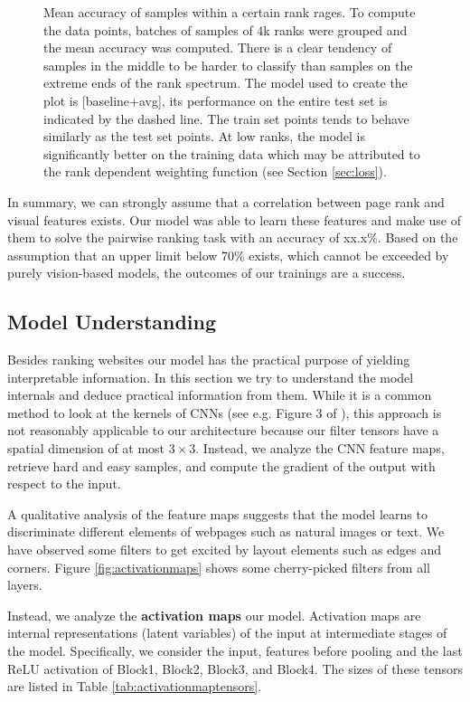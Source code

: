\begin{figure}
\begin{tikzpicture}
      \end{tikzpicture}
    \caption[Accuracy vs. rank]{Mean accuracy of samples within a certain rank rages. To compute the data points, batches of samples of 4k ranks were grouped and the mean accuracy was computed. There is a clear tendency of samples in the middle to be harder to classify than samples on the extreme ends of the rank spectrum. The model used to create the plot is [baseline+avg], its performance on the entire test set is indicated by the dashed line. The train set points tends to behave similarly as the test set points. At low ranks, the model is significantly better on the training data which may be attributed to the rank dependent weighting function (see Section \ref{sec:loss}).}
    \label{fig:accvsrank}
\end{figure}

In summary, we can strongly assume that a correlation between page rank and visual features exists. Our model was able to learn these features and make use of them to solve the pairwise ranking task with an accuracy of xx.x\%. Based on the assumption that an upper limit below 70\% exists, which cannot be exceeded by purely vision-based models, the outcomes of our trainings are a success.

\subsection{Model Understanding}

Besides ranking websites our model has the practical purpose of yielding interpretable information. In this section we try to understand the model internals and deduce practical information from them. While it is a common method to look at the kernels of CNNs (see e.g. Figure 3 of \cite{krizhevsky:imagenet}), this approach is not reasonably applicable to our architecture because our filter tensors have a spatial dimension of at most $3\times3$. Instead, we analyze the CNN feature maps, retrieve hard and easy samples, and compute the gradient of the output with respect to the input.

A qualitative analysis of the feature maps suggests that the model learns to discriminate different elements of webpages such as natural images or text. We have observed some filters to get excited by layout elements such as edges and corners. Figure \ref{fig:activationmaps} shows some cherry-picked filters from all layers.

Instead, we analyze the \textbf{activation maps} our model. Activation maps are internal representations (latent variables) of the input at intermediate stages of the model. Specifically, we consider the input, features before pooling and the last ReLU activation of Block1, Block2, Block3, and Block4. The sizes of these tensors are listed in Table \ref{tab:activationmaptensors}.

